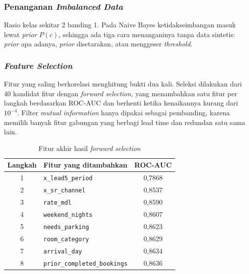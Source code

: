 \subsubsection{Penanganan \textit{Imbalanced Data}}
Rasio kelas sekitar 2 banding 1. Pada Naive Bayes ketidakseimbangan masuk lewat \textit{prior} $P(c)$, sehingga ada tiga cara menanganinya tanpa data sintetis: \textit{prior} apa adanya, \textit{prior} disetarakan, atau menggeser \textit{threshold}.


\subsubsection{\textit{Feature Selection}}
Fitur yang saling berkorelasi menghitung bukti dua kali. Seleksi dilakukan dari 40 kandidat fitur dengan \textit{forward selection}, yang menambahkan satu fitur per langkah berdasarkan ROC-AUC dan berhenti ketika kenaikannya kurang dari $10^{-4}$. Filter \textit{mutual information} hanya dipakai sebagai pembanding, karena memilih banyak fitur gabungan yang berbagi lead time dan redundan satu sama lain.

\begin{table}[H]
	\centering
	\caption{Fitur akhir hasil \textit{forward selection}}
	\label{tab:nb-fitur}
	\begin{tabular}{c l c}
		\toprule
		\textbf{Langkah} & \textbf{Fitur yang ditambahkan} & \textbf{ROC-AUC} \\
		\midrule
		1 & \texttt{x\_lead5\_period} & 0,7868 \\
		2 & \texttt{x\_sr\_channel} & 0,8537 \\
		3 & \texttt{rate\_mdl} & 0,8590 \\
		4 & \texttt{weekend\_nights} & 0,8607 \\
		5 & \texttt{needs\_parking} & 0,8623 \\
		6 & \texttt{room\_category} & 0,8629 \\
		7 & \texttt{arrival\_day} & 0,8634 \\
		8 & \texttt{prior\_completed\_bookings} & 0,8636 \\
		\bottomrule
	\end{tabular}
\end{table}

